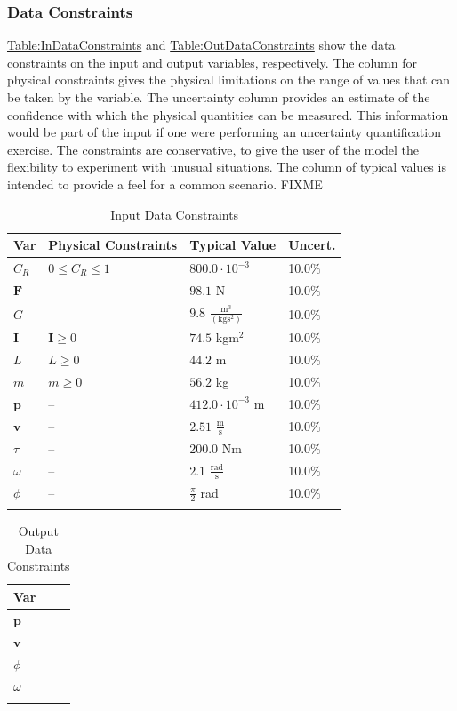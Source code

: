 \documentclass[12pt]{article}
\begin{document}
\subsubsection{Data Constraints}
\label{Sec:DataConstraints}
\hyperref[Table:InDataConstraints]{Table:InDataConstraints} and \hyperref[Table:OutDataConstraints]{Table:OutDataConstraints} show the data constraints on the input and output variables, respectively. The column for physical constraints gives the physical limitations on the range of values that can be taken by the variable. The uncertainty column provides an estimate of the confidence with which the physical quantities can be measured. This information would be part of the input if one were performing an uncertainty quantification exercise. The constraints are conservative, to give the user of the model the flexibility to experiment with unusual situations. The column of typical values is intended to provide a feel for a common scenario. FIXME
\begin{longtable}{l l l l}
\toprule
Var & Physical Constraints & Typical Value & Uncert.
\\
\midrule
${C_{R}}$ & $0\leq{}{C_{R}}\leq{}1$ & $800.0\cdot{}10^{-3}$ & 10.0$\%$
\\
$\mathbf{F}$ & -- & $98.1$ N & 10.0$\%$
\\
$G$ & -- & $9.8$ $\frac{\text{m}^{3}}{(\text{kg}\text{s}^{2})}$ & 10.0$\%$
\\
$\mathbf{I}$ & $\mathbf{I}\geq{}0$ & $74.5$ kg$\text{m}^{2}$ & 10.0$\%$
\\
$L$ & $L\geq{}0$ & $44.2$ m & 10.0$\%$
\\
$m$ & $m\geq{}0$ & $56.2$ kg & 10.0$\%$
\\
$\mathbf{p}$ & -- & $412.0\cdot{}10^{-3}$ m & 10.0$\%$
\\
$\mathbf{v}$ & -- & $2.51$ $\frac{\text{m}}{\text{s}}$ & 10.0$\%$
\\
$τ$ & -- & $200.0$ Nm & 10.0$\%$
\\
$ω$ & -- & $2.1$ $\frac{\text{rad}}{\text{s}}$ & 10.0$\%$
\\
$ϕ$ & -- & $\frac{π}{2}$ rad & 10.0$\%$
\\
\bottomrule
\caption{Input Data Constraints}
\label{Table:InDataConstraints}
\end{longtable}
\begin{longtable}{l}
\toprule
Var
\\
\midrule
$\mathbf{p}$
\\
$\mathbf{v}$
\\
$ϕ$
\\
$ω$
\\
\bottomrule
\caption{Output Data Constraints}
\label{Table:OutDataConstraints}
\end{longtable}
\end{document}
